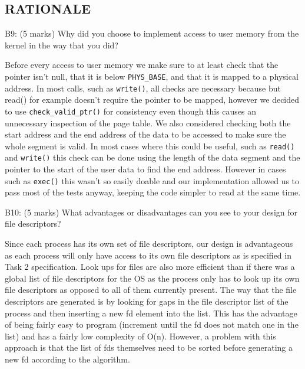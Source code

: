 \subsection*{RATIONALE}

\noindent B9: (5 marks)
Why did you choose to implement access to user memory from the
kernel in the way that you did?


Before every access to user memory we make sure to at least check that the pointer isn't null, that it is below \texttt{PHYS\_BASE}, and  that it is mapped to a physical address.
In most calls, such as \texttt{write()}, all checks are necessary because
but read() for example doesn't require the pointer to be mapped, however we decided to use \texttt{check\_valid\_ptr()} for consistency even though this causes an unnecessary inspection of the page table.
We also considered checking both the start address and the end address of the data to be accessed to make sure the whole segment is valid.
In most cases where this could be useful, such as \texttt{read()} and \texttt{write()} this check can be done using the length of the data segment and the pointer to the start of the user data to find the end address. However in cases such as \texttt{exec()} this wasn't so easily doable and our implementation allowed us to pass most of the tests anyway, keeping the code simpler to read at the same time.


\noindent B10: (5 marks)
What advantages or disadvantages can you see to your design
for file descriptors?


Since each process has its own set of file descriptors, our design is advantageous as each process will only have access to its own file descriptors as is specified in Task 2 specification. Look ups for files are also more efficient than if there was a global list of file descriptors for the OS as the process only has to look up its own file descriptors as opposed to all of them currently present. The way that the file descriptors are generated is by looking for gaps in the file descriptor list of the process and then inserting a new fd element into the list. This has the advantage of being fairly easy to program (increment until the fd does not match one in the list) and has a fairly low complexity of O(n). However, a problem with this approach is that the list of fds themselves need to be sorted before generating a new fd according to the algorithm.

